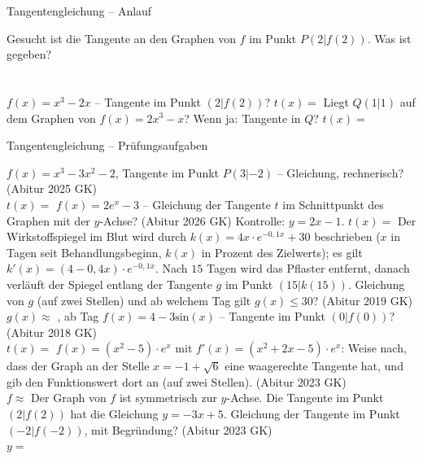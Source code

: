 \setcounter{aufgabe}{42}

\begin{aufgabe}{Tangentengleichung – Anlauf}
\begin{teile}
\teil Gesucht ist die Tangente an den Graphen von $f$ im Punkt $P(2 | f(2))$. Was ist gegeben? \\  \\  \\ 
\teil $f(x) = x^3 - 2x$ – Tangente im Punkt $(2 | f(2))$? $t(x) =$ \leerfeld
\teil Liegt $Q(1 | 1)$ auf dem Graphen von $f(x) = 2x^3 - x$? Wenn ja: Tangente in $Q$? $t(x) =$ \leerfeld
\end{teile}
\end{aufgabe}

\begin{aufgabe}{Tangentengleichung – Prüfungsaufgaben}
\begin{teile}
\teil $f(x) = x^3 - 3x^2 - 2$, Tangente im Punkt $P(3 | -2)$ – Gleichung, rechnerisch? \hfill (Abitur 2025 GK) \\ $t(x) =$ \leerfeld
\teil $f(x) = 2e^x - 3$ – Gleichung der Tangente $t$ im Schnittpunkt des Graphen mit der $y$-Achse? \hfill (Abitur 2026 GK) Kontrolle: $y = 2x - 1$. $t(x) =$ \leerfeld
\teil Der Wirkstoffspiegel im Blut wird durch $k(x) = 4x \cdot e^{-0{,}1x} + 30$ beschrieben ($x$ in Tagen seit Behandlungsbeginn, $k(x)$ in Prozent des Zielwerts); es gilt $k'(x) = (4 - 0{,}4x) \cdot e^{-0{,}1x}$. Nach $15$ Tagen wird das Pflaster entfernt, danach verläuft der Spiegel entlang der Tangente $g$ im Punkt $(15 | k(15))$. Gleichung von $g$ (auf zwei Stellen) und ab welchem Tag gilt $g(x) \le 30$? \hfill (Abitur 2019 GK) \\ $g(x) \approx$ \leerfeld , ab Tag \leerfeld
\teil $f(x) = 4 - 3\mathrm{sin}(x)$ – Tangente im Punkt $(0 | f(0))$? \hfill (Abitur 2018 GK) \\ $t(x) =$ \leerfeld
\teil $f(x) = (x^2 - 5) \cdot e^x$ mit $f'(x) = (x^2 + 2x - 5) \cdot e^x$: Weise nach, dass der Graph an der Stelle $x = -1 + \sqrt{6}$ eine waagerechte Tangente hat, und gib den Funktionswert dort an (auf zwei Stellen). \hfill (Abitur 2023 GK) \\ $f \approx$ \leerfeld
\teil Der Graph von $f$ ist symmetrisch zur $y$-Achse. Die Tangente im Punkt $(2 | f(2))$ hat die Gleichung $y = -3x + 5$. Gleichung der Tangente im Punkt $(-2 | f(-2))$, mit Begründung? \hfill (Abitur 2023 GK) \\ $y =$ \leerfeld
\end{teile}
\end{aufgabe}


